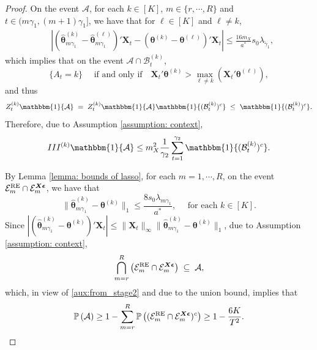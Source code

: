 \documentclass[aos,preprint]{imsart}
\theoremstyle{plain}
\theoremstyle{definition}
\newcommand{\btheta}{\boldsymbol{\theta}}
\newcommand{\bd}[1]{\boldsymbol{#1}}
\newcommand{\hbtheta}{\widehat{\boldsymbol{\theta}}}
\newcommand{\idf}{\mathbbm{1}}
\newcommand{\bX}{\boldsymbol{X}}
\newcommand{\tgamma}{\widetilde{\gamma}}
\newcommand{\mE}{\mathcal{E}}
\newcommand{\bepsilon}{\bd{\epsilon}}
\newcommand{\cA}{\mathcal{A}}
\newcommand{\Pro}{\mathbb{P}}
\begin{document}
\begin{appendix}
\begin{proof}
On the event $\mathcal{A}$, for each $k \in[K]$, $m \in \{r,\cdots,R\}$ and $t \in (m\gamma_1, (m+1)\gamma_1]$, we have that for $\ell \in [K]$ and $\ell \neq k$,
\begin{align*}
&|(\hbtheta_{m\gamma_1}^{(k)}-\hbtheta_{m\gamma_1}^{(\ell)})'\bX_t-(\btheta^{(k)}-\btheta^{(\ell)})'\bX_t|
 \le \frac{16m_X}{a^*}s_0\lambda_{\tgamma_1},
\end{align*}
which implies that on the event $\mathcal{A}\cap \mathcal{B}_t^{(k)}$,
$$
\{A_t = k \} \quad \text{ if and only if} \quad
\bX_t'\btheta^{(k)}>\max_{\ell \neq k}(\bX_t'\btheta^{(\ell)}),
$$
and thus
$$
Z_t^{(k)} \idf\{\cA\}\; = \;  Z_t^{(k)} \idf\{\cA\} \idf\{(\mathcal{B}_t^{(k)})^c\} \; \leq \; \idf\{(\mathcal{B}_t^{(k)})^c\}.
$$
Therefore, due to Assumption \ref{assumption: context},
\begin{align}\label{aux:III_gamma2}
    III^{(k)} \idf\{\cA\} \leq  m_X^2 \frac{1}{\gamma_2} \sum_{t=1}^{\gamma_2} \idf\{(\mathcal{B}_t^{(k)})^c\}.
\end{align}


By Lemma \ref{lemma: bounds of lasso}, for each $m=1,\cdots,R$, on the event $\mE_m^{\textup{RE}} \cap \mE_m^{\bX\bepsilon}$,  we have that 
\begin{equation*}
    \|\hbtheta_{m\gamma_1}^{(k)}-\btheta^{(k)}\|_1\le \frac{8s_0\lambda_{m \gamma_1}}{a^*}, \quad \text{ for each } k \in [K].
\end{equation*}
Since $|(\hbtheta_{m\gamma_1}^{(k)}-\btheta^{(k)})'\bX_t|\le \|\bX_{t}\|_{\infty}\|\hbtheta_{m\gamma_1}^{(k)}-\btheta^{(k)}\|_1$, due to Assumption \ref{assumption: context}, 
\begin{align*}
    \bigcap_{m=r}^{R} \left(\mE_m^{\textup{RE}} \cap \mE_m^{\bX\bepsilon} \right) \; \subseteq \; \mathcal{A},
\end{align*}
which, in view of \eqref{aux:from_stage2}  and due to the union bound, implies that
$$\Pro\left(\mathcal{A}\right) \geq
1 - \sum_{m=r}^{R} \Pro\left( (\mE_m^{\textup{RE}} \cap \mE_m^{\bX\bepsilon})^c \right) \geq 
1 - \frac{6K}{T^2}.
$$
 


\end{proof}
\end{appendix}
\end{document}
